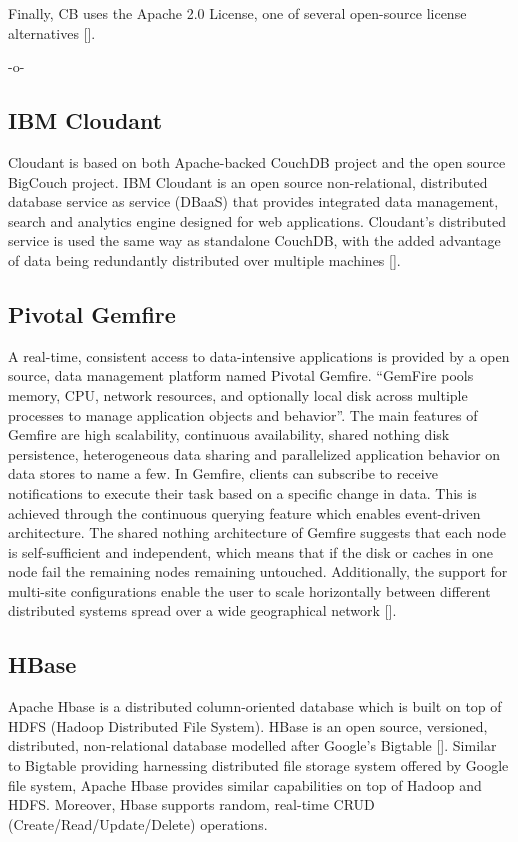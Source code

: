 Finally, CB uses the Apache 2.0 License, one of several open-source
license alternatives [\cite{www-quora-cbs}].


     -o-

\subsection{IBM Cloudant}
     
Cloudant is based on both Apache-backed CouchDB project and the open
source BigCouch project. IBM Cloudant is an open source
non-relational, distributed database service as service (DBaaS) that
provides integrated data management, search and analytics engine
designed for web applications. Cloudant's distributed service is used
the same way as standalone CouchDB, with the added advantage of data
being redundantly distributed over multiple
machines [\cite{www-ibm-cloudant}].
   

\subsection{Pivotal Gemfire}
     
A real-time, consistent access to data-intensive applications is
provided by a open source, data management platform named Pivotal
Gemfire. ``GemFire pools memory, CPU, network resources, and
optionally local disk across multiple processes to manage application
objects and behavior''. The main features of Gemfire are high
scalability, continuous availability, shared nothing disk persistence,
heterogeneous data sharing and parallelized application behavior on
data stores to name a few.  In Gemfire, clients can subscribe to
receive notifications to execute their task based on a specific change
in data. This is achieved through the continuous querying feature
which enables event-driven architecture. The shared nothing
architecture of Gemfire suggests that each node is self-sufficient and
independent, which means that if the disk or caches in one node fail
the remaining nodes remaining untouched. Additionally, the support for
multi-site configurations enable the user to scale horizontally
between different distributed systems spread over a wide geographical
network [\cite{www-gemfire}].
     
\subsection{HBase}

Apache Hbase is a distributed column-oriented database which is built
on top of HDFS (Hadoop Distributed File System). HBase is an open
source, versioned, distributed, non-relational database modelled after
Google's Bigtable [\cite{www-hbase}]. Similar to Bigtable providing
harnessing distributed file storage system offered by Google file
system, Apache Hbase provides similar capabilities on top of Hadoop
and HDFS. Moreover, Hbase supports random, real-time CRUD
(Create/Read/Update/Delete) operations.

